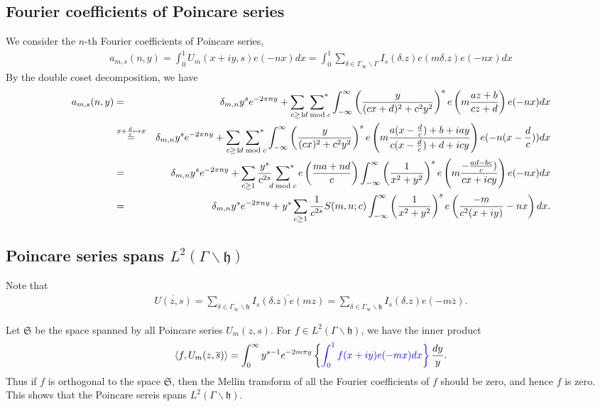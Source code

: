 \documentclass[11pt,reqno]{amsart}
\newcommand{\bea}{\begin{eqnarray}}
\newcommand{\eea}{\end{eqnarray}}
\newcommand{\bna}{\begin{eqnarray*}}
\newcommand{\ena}{\end{eqnarray*}}
\newcommand{\mk}{\mathfrak}
\theoremstyle{definition}
\begin{document}
\subsection{Fourier coefficients of Poincare series}
We consider the $n$-th Fourier coefficients of Poincare series,
\bna
a_{m,s}(n,y)=\int_0^1 U_{m}(x+iy,s) e(-nx)dx
=\int_0^ 1 \sum_{\delta\in \Gamma_\infty\backslash\Gamma}I_s(\delta.z)e(m\delta.z)e(-nx)dx
\ena
By the double coset decomposition, we have
\bna
a_{m,s}(n,y)&=&\delta_{m,n}y^{s}e^{-2\pi n y}
+\sum_{c\geq 1}\sideset{}{^*}\sum_{d\bmod c}
\int_{-\infty}^\infty
\left(\frac{y}{(cx+d)^2+c^2y^2}\right)^s e\left(m\frac{az+b}{cz+d}\right)e(-nx)dx\\
&\overset{x+\frac{d}{c}\mapsto x}=&
\delta_{m,n}y^{s}e^{-2\pi n y}
+\sum_{c\geq 1}\sideset{}{^*}\sum_{d\bmod c}
\int_{-\infty}^\infty
\left(\frac{y}{(cx)^2+c^2y^2}\right)^s e\left(m\frac{a(x-\frac{d}{c})+b+iay}{c(x-\frac{d}{c})+d+ icy}\right)e(-n(x-\frac{d}{c}))dx\\
&=&\delta_{m,n}y^{s}e^{-2\pi n y}
+\sum_{c\geq 1}\frac{y^s}{c^{2s}}\sideset{}{^*}\sum_{d\bmod c}e\left(\frac{ma+nd}{c}\right)
\int_{-\infty}^\infty
\left(\frac{1}{x^2+y^2}\right)^s e\left(m\frac{-\frac{ad-bc}{c})}
{cx+ icy}\right)e(-nx)dx\\
&=&\delta_{m,n}y^{s}e^{-2\pi ny}
+y^s\sum_{c\geq 1}\frac{1}{c^{2s}}S(m,n;c)
\int_{-\infty}^\infty
\left(\frac{1}{x^2+y^2}\right)^s e\left(\frac{-m}
{c^2(x+ iy)}-nx\right)dx.
\ena

\subsection{Poincare series spans $L^2(\Gamma\backslash\mk h)$}
Note that
\bna
\overline{U(z,s)}=\sum_{\delta\in\Gamma_\infty\backslash\mk h}\overline{I_s(\delta.z)e(mz)}
=\sum_{\delta\in\Gamma_\infty\backslash\mk h}I_{\overline{s}}(\delta.z)e(-m\overline z).
\ena

Let $\mathfrak S$ be the space spanned by all Poincare series $U_m(z,s)$.
For $f\in L^2(\Gamma\backslash\mk h)$, we have the inner product
\bea
\langle f,U_m(z,\overline s)\rangle
=\int_0^\infty y^{s-1} e^{-2m\pi y}
\left\{\color{blue}\int_0^1 f(x+iy) e(-mx)dx\right\}\frac{dy}{y}.\label{Inner-product-Poincare-autoform}
\eea
Thus if $f$ is orthogonal to the space $\mathfrak S$, then the Mellin transform
of all the Fourier coefficients of $f$ should be zero, and hence $f$ is zero.
This shows that the Poincare sereis spans $L^2(\Gamma\backslash\mk h)$.
\end{document}
